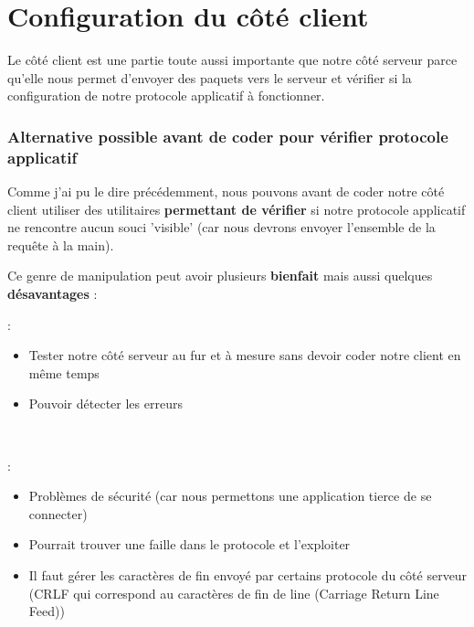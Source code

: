 \chapter{Configuration du côté client}

Le côté client est une partie toute aussi importante que notre côté serveur parce qu'elle nous permet d'envoyer des paquets vers le serveur et vérifier si la configuration de notre protocole applicatif à fonctionner.

\subsection{Alternative possible avant de coder pour vérifier protocole applicatif}

Comme j'ai pu le dire précédemment, nous pouvons avant de coder notre côté client utiliser des utilitaires \textbf{permettant de vérifier} si notre protocole applicatif ne rencontre aucun souci 'visible' (car nous devrons envoyer l'ensemble de la requête à la main). \\ \par

Ce genre de manipulation peut avoir plusieurs \textbf{bienfait} mais aussi quelques \textbf{désavantages} : \\ \par

 :
\begin{itemize}
    \item Tester notre côté serveur au fur et à mesure sans devoir coder notre client en même temps
    \item Pouvoir détecter les erreurs
\end{itemize} \hfill \\ \par

 :
\begin{itemize}
    \item Problèmes de sécurité (car nous permettons une application tierce de se connecter)
    \item Pourrait trouver une faille dans le protocole et l'exploiter
    \item Il faut gérer les caractères de fin envoyé par certains protocole du côté serveur (CRLF qui correspond au caractères de fin de line (Carriage Return Line Feed))
\end{itemize} \hfill \\ \par


